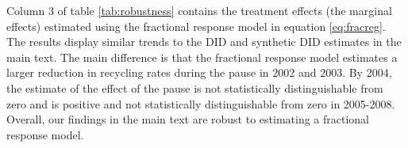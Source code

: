 \documentclass[12pt]{article}
\begin{document}
Column 3 of table \ref{tab:robustness} contains the treatment effects (the marginal effects) estimated using the fractional response model in equation \ref{eq:fracreg}.  The results display similar trends to the DID and synthetic DID estimates in the main text.  The main difference is that the fractional response model estimates a larger reduction in recycling rates during the pause in 2002 and 2003.  By 2004, the estimate of the effect of the pause is not statistically distinguishable from zero and is positive and not statistically distinguishable from zero in 2005-2008.  Overall, our findings in the main text are robust to estimating a fractional response model.
\end{document}
